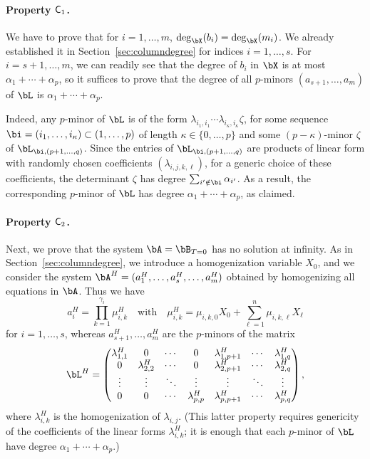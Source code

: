 \documentclass[12pt]{article}
\begin{document}
\paragraph{Property $\mathsf{C}_1$.} We have to prove that for $i=1,\dots,m$,
$\deg_\bX(b_i)=\deg_\bX(m_i)$. We already established it in
Section~\ref{sec:columndegree} for indices $i=1,\dots,s$. For
$i=s+1,\dots,m$, we can readily see that the degree of $b_i$ in $\bX$
is at most $\alpha_1 + \cdots + \alpha_p$, so it suffices to prove
that the degree of all $p$-minors $(a_{s+1},\dots,a_m)$ of $\bL$ is
$\alpha_1 + \cdots + \alpha_p$.

Indeed, any $p$-minor of $\bL$ is of the form $\lambda_{i_1,i_1}
\cdots \lambda_{i_\kappa,i_\kappa} \zeta$, for some sequence
$\bi=(i_1,\dots,i_\kappa) \subset (1,\dots,p)$ of length $\kappa \in
\{0,\dots,p\}$ and some $(p-\kappa)$-minor $\zeta$ of $\bL_{\bi
,(p+1,\dots,q)}$.  Since the entries of $\bL_{\bi
,(p+1,\dots,q)}$ are products of linear form with randomly
chosen coefficients $(\lambda_{i,j,k,\ell})$, for a generic choice of
these coefficients, the determinant $\zeta$ has degree
$\sum_{i' \notin \bi} \alpha_{i'}$. As a result, the corresponding
$p$-minor of $\bL$ has degree $\alpha_1 + \cdots + \alpha_p$, as
claimed.

\paragraph{Property $\mathsf{C}_2$.} Next, we prove that the system $\bA=\bB_{T=0}$ has no solution 
at infinity. As in Section~\ref{sec:columndegree}, we introduce a
homogenization variable $X_0$, and we consider the system
$\bA^H=(a_1^H,\dots,a_s^H,\dots,a_m^H)$ obtained by homogenizing all
equations in $\bA$. Thus we have
$$a_i^H=\prod_{k=1}^{\gamma_i} \mu^H_{i,k} \quad\text{with}\quad \mu^H_{i,k}=\mu_{i,k,0}X_0 + \sum_{\ell = 1}^{n}\mu_{i,k,\ell}X_\ell$$
for $i=1,\dots,s$, whereas $a_{s+1}^H,\dots,a_m^H$ are the $p$-minors of the matrix
\begin{align*}
\bL^H = \left( \begin{matrix}
\lambda^H_{1,1} & 0 & \cdots & 0 & \lambda^H_{1,p+1} & \cdots & \lambda^H_{1, q}\\
0 & \lambda^H_{2,2} & \cdots & 0 & \lambda^H_{2,p+1} & \cdots & \lambda^H_{2, q}\\
\vdots & \vdots & \ddots & \vdots & \vdots & \ddots & \vdots\\
0 & 0 & \cdots & \lambda^H_{p,p} & \lambda^H_{p,p+1} & \cdots & \lambda^H_{p, q}
\end{matrix} \right),  
\end{align*}
where $\lambda^H_{i,k}$ is the homogenization of
$\lambda_{i,j}$. (This latter property requires genericity of the
coefficients of the linear forms $\lambda^H_{i,k}$; it is enough that 
each $p$-minor of $\bL$ have degree $\alpha_1 + \cdots + \alpha_p$.)
\end{document}
